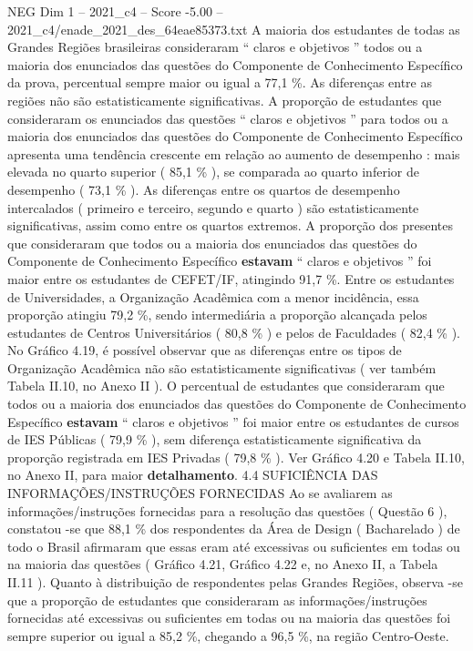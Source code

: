 \begin{textsample}{NEG Dim 1 – 2021\_c4 – Score -5.00 – 2021\_c4/enade\_2021\_des\_64eae85373.txt}
A maioria dos estudantes de todas as Grandes Regiões brasileiras consideraram “ claros e objetivos ” todos ou a maioria dos enunciados das questões do Componente de Conhecimento Específico da prova, percentual sempre maior ou igual a 77,1 \%.
As diferenças entre as regiões não são estatisticamente significativas.
A proporção de estudantes que consideraram os enunciados das questões “ claros e objetivos ” para todos ou a maioria dos enunciados das questões do Componente de Conhecimento Específico apresenta uma tendência crescente em relação ao aumento de desempenho : mais elevada no quarto superior ( 85,1 \% ), se comparada ao quarto inferior de desempenho ( 73,1 \% ).
As diferenças entre os quartos de desempenho intercalados ( primeiro e terceiro, segundo e quarto ) são estatisticamente significativas, assim como entre os quartos extremos.
A proporção dos presentes que consideraram que todos ou a maioria dos enunciados das questões do Componente de Conhecimento Específico \textbf{estavam} “ claros e objetivos ” foi maior entre os estudantes de CEFET/IF, atingindo 91,7 \%.
Entre os estudantes de Universidades, a Organização Acadêmica com a menor incidência, essa proporção atingiu 79,2 \%, sendo intermediária a proporção alcançada pelos estudantes de Centros Universitários ( 80,8 \% ) e pelos de Faculdades ( 82,4 \% ).
No Gráfico 4.19, é possível observar que as diferenças entre os tipos de Organização Acadêmica não são estatisticamente significativas ( ver também Tabela II.10, no Anexo II ).
O percentual de estudantes que consideraram que todos ou a maioria dos enunciados das questões do Componente de Conhecimento Específico \textbf{estavam} “ claros e objetivos ” foi maior entre os estudantes de cursos de IES Públicas ( 79,9 \% ), sem diferença estatisticamente significativa da proporção registrada em IES Privadas ( 79,8 \% ).
Ver Gráfico 4.20 e Tabela II.10, no Anexo II, para maior \textbf{detalhamento}. 4.4 SUFICIÊNCIA DAS INFORMAÇÕES/INSTRUÇÕES FORNECIDAS Ao se avaliarem as informações/instruções fornecidas para a resolução das questões ( Questão 6 ), constatou -se que 88,1 \% dos respondentes da Área de Design ( Bacharelado ) de todo o Brasil afirmaram que essas eram até excessivas ou suficientes em todas ou na maioria das questões ( Gráfico 4.21, Gráfico 4.22 e, no Anexo II, a Tabela II.11 ).
Quanto à distribuição de respondentes pelas Grandes Regiões, observa -se que a proporção de estudantes que consideraram as informações/instruções fornecidas até excessivas ou suficientes em todas ou na maioria das questões foi sempre superior ou igual a 85,2 \%, chegando a 96,5 \%, na região Centro-Oeste.

\end{textsample}

